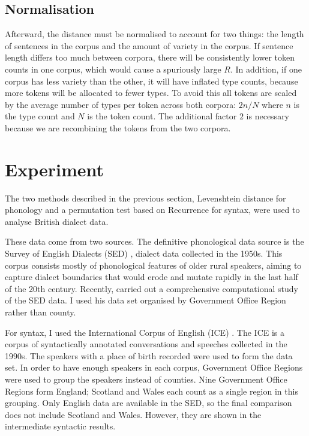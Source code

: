 \documentclass[11pt]{article}
\begin{document}
\subsection{Normalisation}
Afterward, the distance must be normalised to account for two things:
the length of sentences in the corpus and the amount of variety in the
corpus. If sentence length differs too much between corpora, there
will be consistently lower token counts in one corpus, which would
cause a spuriously large $R$. In addition, if one corpus has less
variety than the other, it will have inflated type counts, because
more tokens will be allocated to fewer types. To avoid
this all tokens are scaled by the average number of types per token
across both corpora: $2n/N$ where $n$ is the type count and $N$ is
the token count. The additional factor $2$ is necessary because we are
recombining the tokens from the two corpora.


\section{Experiment}
The two methods described in the previous section, Levenshtein
distance for phonology and a permutation test based on {\sc
  Recurrence} for syntax, were used to analyse British dialect data.

These data come from two sources. The definitive phonological data
source is the Survey of English Dialects (SED) \cite{orton63}, dialect
data collected in the 1950s. This corpus consists mostly of
phonological features of older rural speakers, aiming to capture
dialect boundaries that would erode and mutate rapidly in the last
half of the 20th century. Recently,  carried
out a comprehensive computational study of the SED data. I used his
data set organised by Government Office Region rather than county.

For syntax, I used the International Corpus of English (ICE)
\cite{nelson02}. The ICE is a corpus of syntactically annotated
conversations and speeches collected in the 1990s. The speakers with a
place of birth recorded were used to form the data set. In order to
have enough speakers in each corpus, Government Office Regions were
used to group the speakers instead of counties. Nine Government Office
Regions form England; Scotland and Wales each count as a single region
in this grouping. Only English data are available in the SED, so the
final comparison does not include Scotland and Wales. However, they
are shown in the intermediate syntactic results.
\end{document}
